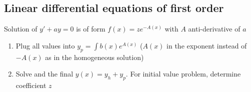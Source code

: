 \newsectionNoPB
\subsection{Linear differential equations of first order}
\rmvspace
\shortproposition Solution of $y' + ay = 0$ is of form $f(x) = z e^{-A(x)}$ with $A$ anti-derivative of $a$

\rmvspace
{} 
\rmvspace
\begin{enumerate}[noitemsep]
    \item Plug all values into $y_p = \int b(x) e^{A(x)}$ ($A(x)$ in the exponent instead of $-A(x)$ as in the homogeneous solution)
    \item Solve and the final $y(x) = y_h + y_p$. For initial value problem, determine coefficient $z$
\end{enumerate}
